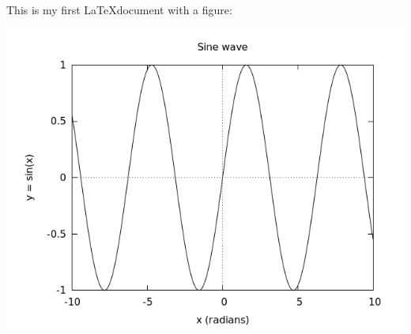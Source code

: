 \documentclass{article}
\begin{document}
This is my first \LaTeX document with a figure:

\includegraphics[scale=0.5]{show_image.png}
\end{document}
